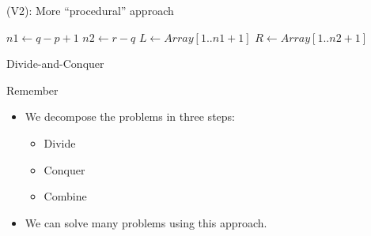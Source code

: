 \begin{frame}
\begin{block}{(V2): More ``procedural'' approach}
\begin{scriptsize}
    \begin{algorithmic}
       \State $n1 \gets q - p + 1$
       \State $n2 \gets r - q$  
       \State $L \gets Array[1 .. n1+1]$
       \State $R \gets Array[1 .. n2+1]$

       \EndFor
           
       \EndFor

       


         \Else
         \EndIf
       \EndFor
    \EndProcedure
    \end{algorithmic}
\end{scriptsize}
\end{block}
\end{frame}

\begin{frame}{Divide-and-Conquer}
  \begin{block}{Remember}
  \begin{itemize}  
  \item We decompose the problems in three steps:
        \begin{itemize}
        \item Divide
        \item Conquer
        \item Combine  
        \end{itemize}
      \item We can solve many problems using this approach.
  \end{itemize}      
  \end{block}
\end{frame}

